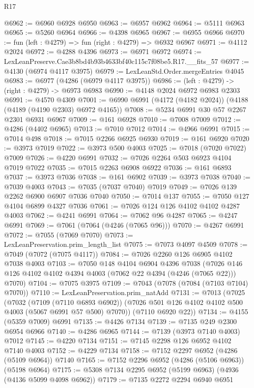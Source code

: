 \begin{lexlean}{R17}
\begin{coremodule}
@6962 := @6960 @6928 @6950
@6963 := @6957 @6962
@6964 := @5111 @6963
@6965 := @5260 @6964
@6966 := @4398 @6965
@6967 := @6955 @6966
@6970 := fun (left : @4279) => fun (right : @4279) => @6932 @6967
@6971 := @4112 @2024
@6972 := @4288 @4396
@6973 := @6971 @6972
@6974 := LexLeanPreserve.Cae3b8bd4b93b4633bf40c115c7f08be5.R17.__fits_57
@6977 := @4130 (@6974 @4117 @3975)
@6979 := LexLeanStd.Order.mergeEntries @4045
@6983 := @6977 (@4286 (@6979 @4117 @3975))
@6986 := (left : @4279) -> (right : @4279) -> @6973 @6983
@6990 := @4148 @2024 @6972 @6983 @2303
@6991 := @4570 @4309
@7001 := @6990 @6991 (@4172 (@4182 @2024)) (@4188 (@4189 (@4190 @2303) @6972 @4165))
@7008 := @5234 @6991 @30 @57 @2267 @2301 @6931 @6967
@7009 := @161 @6928
@7010 := @7008 @7009
@7012 := @4286 (@4402 @6965)
@7013 := @7010 @7012
@7014 := @4966 @6991
@7015 := @7014 @498
@7018 := @7015 @2266 @6925 @6930
@7019 := @161 @6920
@7020 := @3973 @7019
@7022 := @3973 @500 @4003
@7025 := @7018 (@7020 @7022) @7009
@7026 := @4220 @6991
@7032 := @7026 @2264 @503 @6923 @4104 @7019 @7022
@7035 := @7015 @2263 @6908 @6922
@7036 := @161 @6893
@7037 := @3973 @7036
@7038 := @161 @6902
@7039 := @3973 @7038
@7040 := @7039 @4003
@7043 := @7035 (@7037 @7040) @7019
@7049 := @7026 @139 @2262 @6900 @6907 @7036 @7040
@7050 := @7014 @137
@7055 := @7050 @127 @4104 @6899 @4327 @7036
@7061 := @7026 @124 @126 @4102 @4102 @4287 @4003
@7062 := @4241 @6991
@7064 := @7062 @96 @4287
@7065 := @4247 @6991
@7069 := @7061 (@7064 (@4246 (@7065 @96)))
@7070 := @4267 @6991
@7072 := @7055 (@7069 @7070)
@7073 := LexLeanPreservation.prim_length_list
@7075 := @7073 @4097 @4509
@7078 := @7049 (@7072 (@7075 @4117))
@7084 := @7026 @2260 @126 @6905 @4102 @7038 @4003
@7103 := @7050
    @148
    @4104
    @6904
    @4396
    @7038
    (@7026 @146 @126 @4102 @4102 @4394 @4003 (@7062 @22 @4394 (@4246 (@7065 @22))) @7070)
@7104 := @7075 @3975
@7109 := @7043 (@7078 (@7084 (@7103 @7104) @7070))
@7110 := LexLeanPreservation.prim_natAdd
@7131 := @7013
    (@7025
      (@7032
        (@7109 (@7110 @6893 @6902))
        (@7026 @501 @126 @4102 @4102 @500 @4003 (@5067 @6991 @57 @500) @7070))
      (@7110 @6920 @22))
@7134 := @4155 (@5359 @7009) @6991
@7135 := @4426 @7134
@7139 := @7135 @249 @2300 @6954 @6966
@7140 := @4286 @6965
@7144 := @7139 (@3973 @7140 @4003) @7012
@7145 := @4220 @7134
@7151 := @7145 @2298 @126 @6952 @4102 @7140 @4003
@7152 := @4229 @7134
@7158 := @7152 @2297 @6952 (@4286 (@5109 @6964)) @7140
@7165 := @7152 @2296 @6952 (@4286 (@5106 @6963)) (@5198 @6964)
@7175 := @5308 @7134 @2295 @6952 (@5199 @6963) (@4936 (@4136 @5099 @4098 @6962))
@7179 := @7135 @2272 @2294 @6940 @6951

\end{coremodule}
\end{lexlean}

